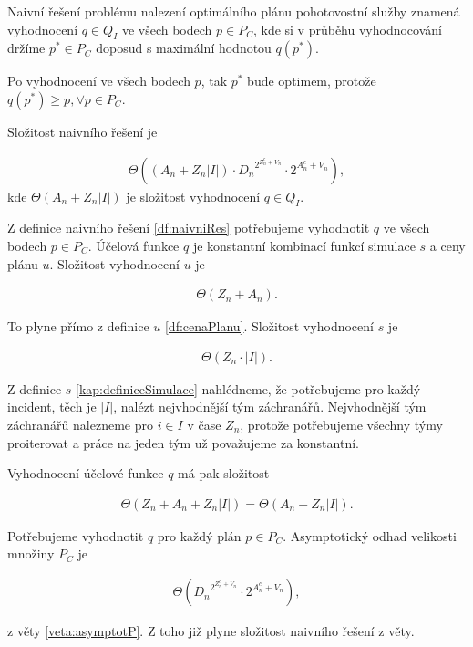 \begin{definice}\label{df:naivniRes}
  Naivní řešení problému nalezení optimálního plánu pohotovostní služby znamená vyhodnocení $q \in Q_I$ ve všech bodech $p \in P_C$,
  kde si v průběhu vyhodnocování držíme $p^* \in P_C$ doposud s maximální hodnotou $q(p^*)$.

  Po vyhodnocení ve všech bodech $p$, tak $p^*$ bude optimem, protože $q(p^*) \geq p, \forall p \in P_C$.
\end{definice}

\begin{veta}\label{veta:slozitostNaivRes}
  Složitost naivního řešení je

  \begin{align*}
    \Theta((A_n + Z_n |I|) \cdot {D_n}^{2^{Z^c_n + V_n}} \cdot 2^{A^c_n + V_n}),
  \end{align*}
  kde $\Theta (A_n + Z_n |I|)$ je složitost vyhodnocení $q \in Q_I$.
\end{veta}
\begin{dukaz}
  Z definice naivního řešení \ref{df:naivniRes} potřebujeme vyhodnotit $q$ ve všech bodech $p \in P_C$.
  Účelová funkce $q$ je konstantní kombinací funkcí simulace $s$ a ceny plánu $u$. Složitost vyhodnocení $u$ je

  \begin{align*}
    \Theta (Z_n + A_n).
  \end{align*}

  To plyne přímo z definice $u$ \ref{df:cenaPlanu}. Složitost vyhodnocení $s$ je

  \begin{align*}
    \Theta (Z_n \cdot |I|).
  \end{align*}

  Z definice $s$ \ref{kap:definiceSimulace} nahlédneme, že potřebujeme pro každý incident, těch je $|I|$, nalézt nejvhodnější tým záchranářů.
  Nejvhodnější tým záchranářů nalezneme pro $i \in I$ v čase $Z_n$, protože potřebujeme všechny týmy proiterovat a práce na jeden tým už považujeme za konstantní. 

  Vyhodnocení účelové funkce $q$ má pak složitost

  \begin{align*}
    \Theta (Z_n + A_n + Z_n |I|) = \Theta (A_n + Z_n |I|).
  \end{align*}

  Potřebujeme vyhodnotit $q$ pro každý plán $p \in P_C$.
  Asymptotický odhad velikosti množiny $P_C$ je 

  \begin{align*}
    \Theta ({D_n}^{2^{Z^c_n + V_n}} \cdot 2^{A^c_n + V_n}),
  \end{align*}

  z věty \ref{veta:asymptotP}. Z toho již plyne složitost naivního řešení z věty.
\end{dukaz}

